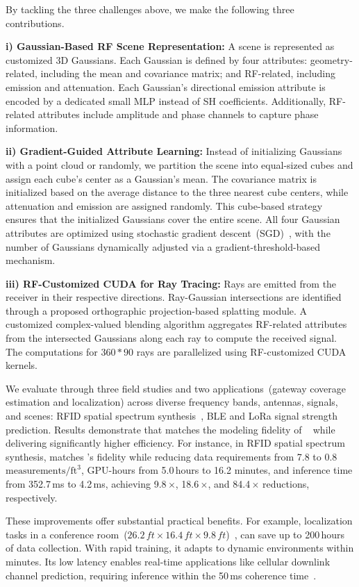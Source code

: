 By tackling the three challenges above, we make the following three contributions.



\textbf{i) Gaussian-Based RF Scene Representation:}
A scene is represented as customized 3D Gaussians. 
Each Gaussian is defined by four attributes: geometry-related, including the mean and covariance matrix; and RF-related, including emission and attenuation.
Each Gaussian's directional emission attribute is encoded by a dedicated small MLP instead of SH coefficients.
Additionally, RF-related attributes include amplitude and phase channels to capture phase information.


\textbf{ii) Gradient-Guided Attribute Learning:}
Instead of initializing Gaussians with a point cloud or randomly, we partition the scene into equal-sized cubes and assign each cube's center as a Gaussian's mean.  
The covariance matrix is initialized based on the average distance to the three nearest cube centers, while attenuation and emission are assigned randomly.  
This cube-based strategy ensures that the initialized Gaussians cover the entire scene.
All four Gaussian attributes are optimized using stochastic gradient descent~(SGD)~\cite{amari1993backpropagation}, with the number of Gaussians dynamically adjusted via a gradient-threshold-based mechanism.



\textbf{iii) RF-Customized CUDA for Ray Tracing:}  
Rays are emitted from the receiver in their respective directions.  
Ray-Gaussian intersections are identified through a proposed orthographic projection-based splatting module.  
A customized complex-valued blending algorithm aggregates RF-related attributes from the intersected Gaussians along each ray to compute the received signal.  
The computations for $360*90$ rays are parallelized using RF-customized CUDA kernels.

We evaluate \ourSystem through three field studies and two applications~(gateway coverage estimation and localization) across diverse frequency bands, antennas, signals, and scenes: RFID spatial spectrum synthesis~\cite{zhao2023nerf}, BLE and LoRa signal strength prediction.  
Results demonstrate that \ourSystem matches the modeling fidelity of \nerft~\cite{zhao2023nerf} while delivering significantly higher efficiency.  
For instance, in RFID spatial spectrum synthesis, \ourSystem matches \nerft's fidelity while reducing data requirements from 7.8 to 0.8\,\(\text{measurements}/\text{ft}^3\), GPU-hours from 5.0\,hours to 16.2 minutes, and inference time from 352.7\,ms to 4.2\,ms, achieving 9.8\,$\times$, 18.6\,$\times$, and 84.4\,$\times$ reductions, respectively.



These improvements offer substantial practical benefits. 
For example, localization tasks in a conference room~(\(26.2\,\textit{ft} \times 16.4\,\textit{ft} \times 9.8\,\textit{ft}\))~\cite{matlab_conference_room}, \ourSystem can save up to 200\,hours of data collection.
With rapid training, it adapts to dynamic environments within minutes.  
Its low latency enables real-time applications like cellular downlink channel prediction, requiring inference within the 50\,ms coherence time~\cite{liu2021fire, marzetta2016fundamentals}.


